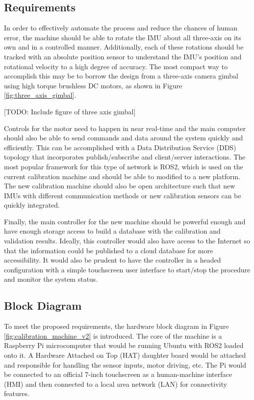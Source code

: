\subsection{Requirements}
In order to effectively automate the process and reduce the chances of human error, the machine should be able to rotate the IMU about all three-axis on its own and in a controlled manner.
Additionally, each of these rotations should be tracked with an absolute position sensor to understand the IMU's position and rotational velocity to a high degree of accuracy.
The most compact way to accomplish this may be to borrow the design from a three-axis camera gimbal using high torque brushless DC motors, as shown in Figure \ref{fig:three_axis_gimbal}.

[TODO: Include figure of three axis gimbal]

Controls for the motor need to happen in near real-time and the main computer should also be able to send commands and data around the system quickly and efficiently.
This can be accomplished with a Data Distribution Service (DDS) topology that incorporates publish/subscribe and client/server interactions.
The most popular framework for this type of network is ROS2, which is used on the current calibration machine and should be able to modified to a new platform.
The new calibration machine should also be open architecture such that new IMUs with different communication methods or new calibration sensors can be quickly integrated.

Finally, the main controller for the new machine should be powerful enough and have enough storage access to build a database with the calibration and validation results.
Ideally, this controller would also have access to the Internet so that the information could be published to a cloud database for more accessibility.
It would also be prudent to have the controller in a headed configuration with a simple touchscreen user interface to start/stop the procedure and monitor the system status.

\subsection{Block Diagram}
To meet the proposed requirements, the hardware block diagram in Figure \ref{fig:calibration_machine_v2} is introduced.
The core of the machine is a Raspberry Pi microcomputer that would be running Ubuntu with ROS2 loaded onto it.
A Hardware Attached on Top (HAT) daughter board would be attached and responsible for handling the sensor inputs, motor driving, etc.
The Pi would be connected to an official 7-inch touchscreen as a human-machine interface (HMI) and then connected to a local area network (LAN) for connectivity features.

